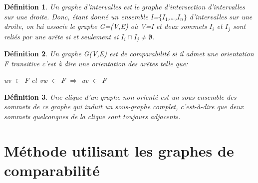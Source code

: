 \documentclass[12pt, a4paper]{report}
\newtheorem{definition}{Définition}
\begin{document}
\begin{definition}
Un graphe d’intervalles est le graphe d’intersection d’intervalles sur une droite. Donc, étant donné un ensemble I=$\{I_1$,…,$I_n\}$ d’intervalles sur une droite, on lui associe le graphe  G=(V,E) où V=I et deux sommets $I_i$ et $I_j$ sont reliés par une arête si et seulement si $I_i \cap I_j \ne  \emptyset$.
\end{definition}
\begin{figure}[H]
	\centering

\end{figure}

\begin{definition}
Un graphe G(V,E) est de comparabilité si il admet une orientation F transitive c'est à dire une orientation des arêtes telle que:

uv $\in$ F et vw $\in$ F $\Rightarrow$ uv $\in$ F
\end{definition}

\begin{definition}
Une clique d'un graphe non orienté est un sous-ensemble des sommets de ce graphe qui induit un sous-graphe complet, c'est-à-dire que deux sommets quelconques de la clique sont toujours adjacents.
\end{definition}

\section{Méthode utilisant les graphes de comparabilité}
\end{document}
